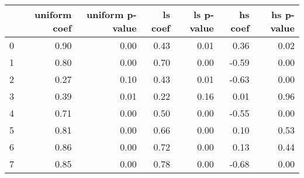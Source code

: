 \begin{tabular}{lrrrrrr}
\toprule
 & uniform coef & uniform p-value & ls coef & ls p-value & hs coef & hs p-value \\
\midrule
0 & 0.90 & 0.00 & 0.43 & 0.01 & 0.36 & 0.02 \\
1 & 0.80 & 0.00 & 0.70 & 0.00 & -0.59 & 0.00 \\
2 & 0.27 & 0.10 & 0.43 & 0.01 & -0.63 & 0.00 \\
3 & 0.39 & 0.01 & 0.22 & 0.16 & 0.01 & 0.96 \\
4 & 0.71 & 0.00 & 0.50 & 0.00 & -0.55 & 0.00 \\
5 & 0.81 & 0.00 & 0.66 & 0.00 & 0.10 & 0.53 \\
6 & 0.86 & 0.00 & 0.72 & 0.00 & 0.13 & 0.44 \\
7 & 0.85 & 0.00 & 0.78 & 0.00 & -0.68 & 0.00 \\
\bottomrule
\end{tabular}
